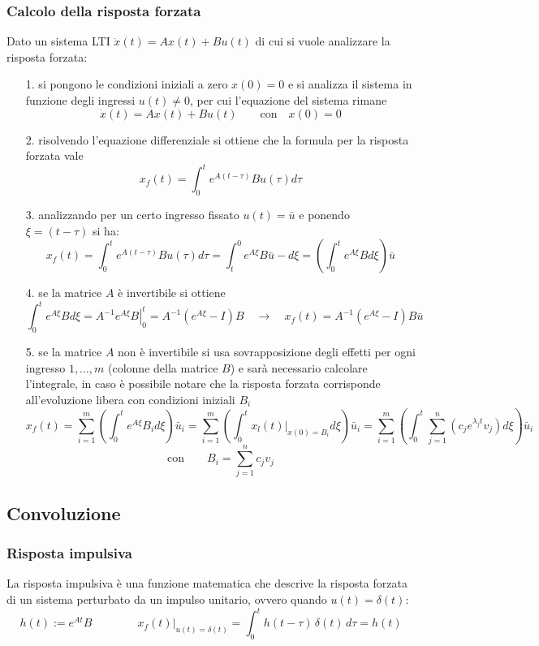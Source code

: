 \subsubsection*{Calcolo della risposta forzata}
Dato un sistema LTI \(\dot{x}(t) = Ax(t) + Bu(t)\) di cui si vuole analizzare la risposta forzata:
\begin{itemize}
	\item[1.] si pongono le condizioni iniziali a zero \(x(0) = 0\) e si analizza il sistema in funzione degli ingressi
	\(u(t) \neq 0\), per cui l'equazione del sistema rimane \[\dot{x}(t) = Ax(t) + Bu(t) \qquad \text{con} \quad x(0) = 0\]
	\item[2.] risolvendo l'equazione differenziale si ottiene che la formula per la risposta forzata vale
	\[x_f(t) = \int_{0}^{t} e^{A(t-\tau)} Bu(\tau) d\tau\]
	\item[3.] analizzando per un certo ingresso fissato \(u(t) = \bar{u}\) e ponendo \(\xi = (t - \tau)\) si ha:
	\[x_f(t) = \int_{0}^{t} e^{A(t-\tau)} Bu(\tau) d\tau = \int_{t}^{0} e^{A\xi} B\bar{u} -d\xi = \left(\int_{0}^{t} e^{A\xi} B d\xi\right) \bar{u}\]
	\item[4.] se la matrice \(A\) è invertibile si ottiene
	\[\int_{0}^{t} e^{A\xi} B d\xi = \left. A^{-1} e^{A\xi} B \right|_0^t = A^{-1} \left(e^{A\xi} - I\right) B \quad \rightarrow \quad x_f(t) = A^{-1} \left(e^{A\xi} - I\right) B \bar{u}\]
	\item[5.] se la matrice \(A\) non è invertibile si usa sovrapposizione degli effetti per ogni ingresso \(1, \dots, m\) (colonne
	della matrice \(B\)) e sarà necessario calcolare l'integrale, in caso è possibile notare che la risposta forzata corrisponde 
	all'evoluzione libera con condizioni iniziali \(B_i\)
	\[x_f(t) = \sum_{i=1}^{m} \left(\int_{0}^{t} e^{A\xi} B_i d\xi\right) \bar{u}_i = \sum_{i=1}^{m} \left(\int_{0}^{t} \left.x_l(t) \right|_{x(0)=B_i} d\xi\right) \bar{u}_i = \sum_{i=1}^{m} \left(\int_{0}^{t} \sum_{j=1}^{n} \left(c_j e^{\lambda_j t} v_j\right)  d\xi\right) \bar{u}_i\]
	\[\text{con} \qquad B_i = \sum_{j=1}^{n} c_j v_j\]
\end{itemize}

\newpage


\subsection{Convoluzione}
\subsubsection*{Risposta impulsiva}
La risposta impulsiva è una funzione matematica che descrive la risposta forzata di un sistema perturbato da un impulso unitario,
ovvero quando \(u(t) = \delta(t)\):
\[h(t) := e^{At}B \qquad\qquad \left. x_f(t) \right|_{u(t) = \delta(t)} = \int_{0}^{t} h(t-\tau) \, \delta(t) \, d\tau= h(t)\]

